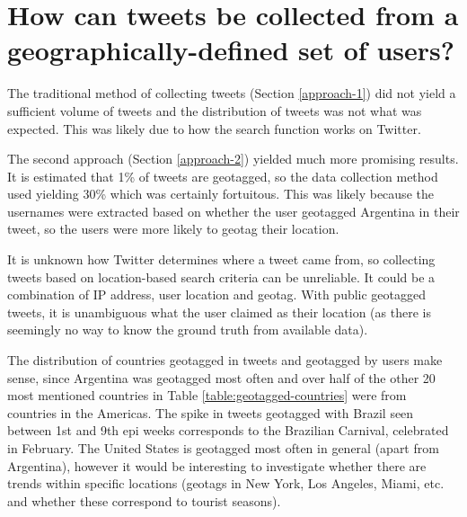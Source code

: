 



\section{How can tweets be collected from a geographically-defined set of users?}

The traditional method of collecting tweets (Section \ref{approach-1}) did not yield a sufficient volume of tweets and the distribution of tweets was not what was expected. This was likely due to how the search function works on Twitter.

The second approach (Section \ref{approach-2}) yielded much more promising results. It is estimated that 1\% of tweets are geotagged, so the data collection method used yielding 30\% which was certainly fortuitous. This was likely because the usernames were extracted based on whether the user geotagged Argentina in their tweet, so the users were more likely to geotag their location.

It is unknown how Twitter determines where a tweet came from, so collecting tweets based on location-based search criteria can be unreliable. It could be a combination of IP address, user location and geotag. With public geotagged tweets, it is unambiguous what the user claimed as their location (as there is seemingly no way to know the ground truth from available data).

The distribution of countries geotagged in tweets and geotagged by users make sense, since Argentina was geotagged most often and over half of the other 20 most mentioned countries in Table \ref{table:geotagged-countries} were from countries in the Americas. The spike in tweets geotagged with Brazil seen between 1st and 9th epi weeks corresponds to the Brazilian Carnival, celebrated in February. The United States is geotagged most often in general (apart from Argentina), however it would be interesting to investigate whether there are trends within specific locations (geotags in New York, Los Angeles, Miami, etc. and whether these correspond to tourist seasons). 

